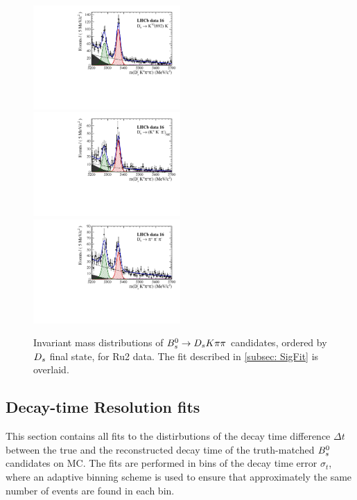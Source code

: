 \begin{figure}[h]
\includegraphics[height=!,width=0.5\textwidth]{figs/MassFit/signal_y16_KsK.pdf}
\includegraphics[height=!,width=0.5\textwidth]{figs/MassFit/signal_y16_KKpi_NR.pdf}
\includegraphics[height=!,width=0.5\textwidth]{figs/MassFit/signal_y16_pipipi.pdf}
\caption{Invariant mass distributions of ${{B}^0_{s}}\rightarrow{\ensuremath{{D}_{s}}}{\ensuremath{K}}{\ensuremath{\pi}}{\ensuremath{\pi}}$ candidates, ordered by ${{D}_{s}}$ final state, for Ru2 data.
The fit described in \ref{subsec: SigFit} is overlaid.}
\label{fig:massfits_signal_Run2}
\end{figure}



\subsection{Decay-time Resolution fits}
\label{subsec:DecResFits}

This section contains all fits to the distirbutions of the decay time difference $\Delta t$ between the true and the reconstructed decay time of the truth-matched ${{B}^0_{s}}$ candidates on MC.
The fits are performed in bins of the decay time error $\sigma_{t}$, where an adaptive binning scheme is used to ensure that approximately the same number of events are found in each bin. 

